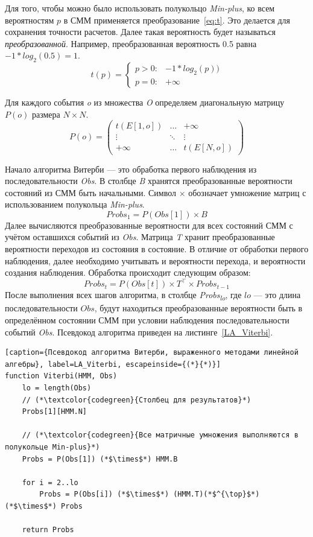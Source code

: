 Для того, чтобы можно было использовать полукольцо \emph{Min-plus}, 
ко всем вероятностям $p$ в СММ применяется 
преобразование~\ref{eq:t}.
Это делается для сохранения точности расчетов.
Далее такая вероятность будет называться \emph{преобразованной}.
Например, преобразованная вероятность 0.5
равна $-1 * log_2(0.5) = 1$.
\begin{equation}
t(p) =
	\begin{cases}
	p > 0: & -1 * log_{2}(p))\\
	p = 0: & +\infty
	\end{cases}       
  \label{eq:t}
\end{equation}

Для каждого события \emph{o} из множества \emph{O} 
определяем диагональную матрицу $P(o)$ размера $N \times N$.
\[
  P(o) =
  \begin{pmatrix}
    t(E[1,o]) & \hdots & +\infty \\
    \vdots & \ddots & \vdots\\
    +\infty & \hdots & t(E[N,o])
  \end{pmatrix}
\]

Начало алгоритма Витерби --- это обработка первого наблюдения 
из последовательности \emph{Obs}.
В столбце \emph{B} хранятся преобразованные вероятности 
состояний из СММ быть начальными.
Символ $\times$ обозначает умножение матриц с использованием 
полукольца \emph{Min-plus}.
\[Probs_{1} = P(Obs[1]) \times B\]
Далее вычисляются преобразованные вероятности для всех 
состояний СММ с учётом ос\-тавшихся событий из \emph{Obs}.
Матрица \emph{T} хранит преобразованные вероятности 
переходов из состояния в состояние.
В отличие от обработки первого наблюдения, далее необходимо 
учитывать и вероятности перехода, и вероятности создания 
наблюдения.
Обработка происходит следующим образом:
\[Probs_{t} = P(Obs[t]) \times T^{\top} \times Probs_{t - 1}\]
После выполнения всех шагов алгоритма, в столбце 
\emph{Probs\textsubscript{lo}}, где $lo$ --- это длина 
последовательности $Obs$, будут находиться преобразованные 
вероятности быть в определённом состоянии СММ при условии 
наблюдения последовательности событий \emph{Obs}.
Псевдокод алгоритма приведен на листинге~\ref{LA_Viterbi}.
\begin{lstlisting}[caption={Псевдокод алгоритма Витерби, выраженного методами линейной алгебры}, label=LA_Viterbi, escapeinside={(*}{*)}]
function Viterbi(HMM, Obs)
	lo = length(Obs)
	// (*\textcolor{codegreen}{Столбец для результатов}*)
	Probs[1][HMM.N]

	// (*\textcolor{codegreen}{Все матричные умножения выполняются в полукольце Min-plus}*)
	Probs = P(Obs[1]) (*$\times$*) HMM.B
	
	for i = 2..lo
		Probs = P(Obs[i]) (*$\times$*) (HMM.T)(*$^{\top}$*) (*$\times$*) Probs
		
	return Probs
\end{lstlisting}


